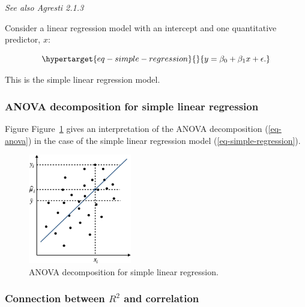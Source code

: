 \documentclass[
  11pt,
  letterpaper,
  oneside]{book}
\theoremstyle{definition}
\theoremstyle{plain}
\theoremstyle{plain}
\theoremstyle{plain}
\theoremstyle{remark}
\begin{document}
\emph{See also Agresti 2.1.3}

Consider a linear regression model with an intercept and one
quantitative predictor, \(x\):

\begin{equation}\protect\hypertarget{eq-simple-regression}{}{
y = \beta_0 + \beta_1 x + \epsilon.
}\label{eq-simple-regression}\end{equation}

This is the simple linear regression model.

\hypertarget{anova-decomposition-for-simple-linear-regression}{%
\subsubsection{ANOVA decomposition for simple linear
regression}\label{anova-decomposition-for-simple-linear-regression}}

Figure Figure~\ref{fig-anova-simple-linear-regression} gives an
interpretation of the ANOVA decomposition (\ref{eq-anova}) in the case
of the simple linear regression model (\ref{eq-simple-regression}).

\begin{figure}

{\centering \includegraphics[width=0.4\textwidth,height=\textheight]{figures/anova-simple-linear-regression.png}

}

\caption{\label{fig-anova-simple-linear-regression}ANOVA decomposition
for simple linear regression.}

\end{figure}

\hypertarget{connection-between-r2-and-correlation}{%
\subsubsection{\texorpdfstring{Connection between \(R^2\) and
correlation}{Connection between R\^{}2 and correlation}}\label{connection-between-r2-and-correlation}}
\end{document}
